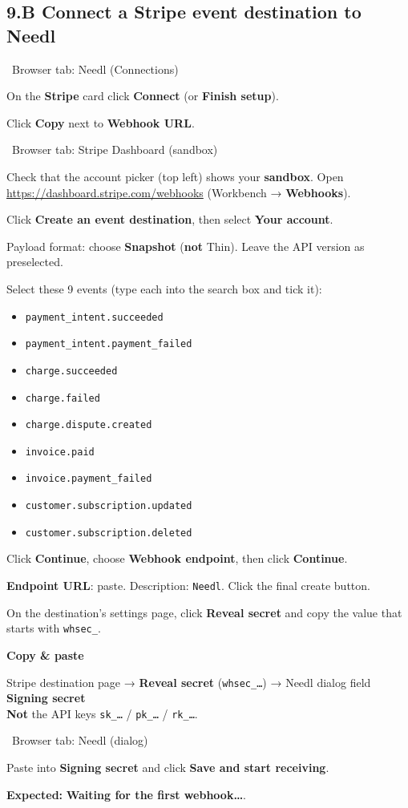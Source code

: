 \documentclass[11pt,a4paper]{article}
\newcommand{\ui}[1]{\textbf{#1}}
\newcommand{\where}[1]{\par\smallskip\noindent\colorbox{winbg}{\color{winfg}\bfseries\strut\ #1\ }\par\nopagebreak[4]}
\newcommand{\lit}[1]{\texttt{#1}}
\newenvironment{xfer}{\def\FrameCommand{\fboxsep=6pt\colorbox{xferbg}}\MakeFramed{\advance\hsize-\width\FrameRestore}\textbf{Copy \& paste}\par}{\endMakeFramed}
\begin{document}
\subsection*{9.B Connect a Stripe event destination to Needl}
\where{Browser tab: Needl (Connections)}
\begin{steps}
\item On the \ui{Stripe} card click \ui{Connect} (or \ui{Finish setup}).
\item Click \ui{Copy} next to \ui{Webhook URL}.
\end{steps}
\where{Browser tab: Stripe Dashboard (sandbox)}
\begin{steps}[resume]
\item Check that the account picker (top left) shows your \textbf{sandbox}. Open \url{https://dashboard.stripe.com/webhooks} (Workbench → \ui{Webhooks}).
\item Click \ui{Create an event destination}, then select \ui{Your account}.
\item Payload format: choose \ui{Snapshot} (\textbf{not} Thin). Leave the API version as preselected.
\item Select these 9 events (type each into the search box and tick it):
\begin{itemize}[itemsep=0pt]
\item \lit{payment\_intent.succeeded}
\item \lit{payment\_intent.payment\_failed}
\item \lit{charge.succeeded}
\item \lit{charge.failed}
\item \lit{charge.dispute.created}
\item \lit{invoice.paid}
\item \lit{invoice.payment\_failed}
\item \lit{customer.subscription.updated}
\item \lit{customer.subscription.deleted}
\end{itemize}
\item Click \ui{Continue}, choose \ui{Webhook endpoint}, then click \ui{Continue}.
\item \ui{Endpoint URL}: paste. Description: \lit{Needl}. Click the final create button.
\item On the destination's settings page, click \ui{Reveal secret} and copy the value that starts with \lit{whsec\_}.
\end{steps}
\begin{xfer}
Stripe destination page → \ui{Reveal secret} (\lit{whsec\_…}) → Needl dialog field \ui{Signing secret}\\
\textbf{Not} the API keys \lit{sk\_…} / \lit{pk\_…} / \lit{rk\_…}.
\end{xfer}
\where{Browser tab: Needl (dialog)}
\begin{steps}[resume]
\item Paste into \ui{Signing secret} and click \ui{Save and start receiving}.
\item \textbf{Expected:} \ui{Waiting for the first webhook…}.
\end{steps}
\end{document}
